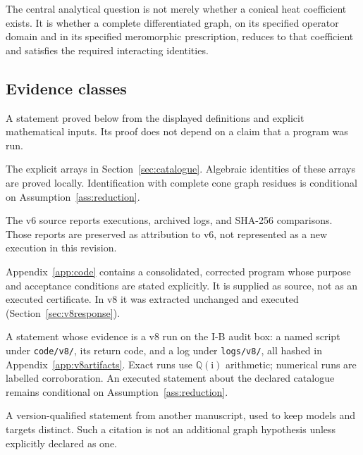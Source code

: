\documentclass[11pt,a4paper]{article}
\newcommand{\ii}{\mathrm i}
\newcommand{\loc}[1]{\nolinkurl{#1}}
\theoremstyle{plain}
\theoremstyle{definition}
\theoremstyle{remark}
\numberwithin{equation}{section}
\begin{document}
The central analytical question is not merely whether a conical
heat coefficient exists. It is whether a complete differentiated
graph, on its specified operator domain and in its specified
meromorphic prescription, reduces to that coefficient and
satisfies the required interacting identities.

\subsection{Evidence classes}

\begin{description}[style=nextline,leftmargin=0pt]
\item[Analytical proof.]
A statement proved below from the displayed definitions and
explicit mathematical inputs. Its proof does not depend on a
claim that a program was run.

\item[Declared catalogue.]
The explicit arrays in Section~\ref{sec:catalogue}. Algebraic
identities of these arrays are proved locally. Identification
with complete cone graph residues is conditional on
Assumption~\ref{ass:reduction}.

\item[Historical executed record.]
The v6 source reports executions, archived logs, and SHA-256
comparisons. Those reports are preserved as attribution to v6,
not represented as a new execution in this revision.

\item[Embedded verification program.]
Appendix~\ref{app:code} contains a consolidated, corrected program
whose purpose and acceptance conditions are stated explicitly.
It is supplied as source, not as an executed certificate.
In v8 it was extracted unchanged and executed
(Section~\ref{sec:v8response}).

\item[Executed in v8.]
A statement whose evidence is a v8 run on the I-B audit box:
a named script under \loc{code/v8/}, its return code, and a log
under \loc{logs/v8/}, all hashed in Appendix~\ref{app:v8artifacts}.
Exact runs use \(\mathbb Q(\ii)\) arithmetic; numerical runs are
labelled corroboration. An executed statement about the declared
catalogue remains conditional on Assumption~\ref{ass:reduction}.

\item[Documentary comparison.]
A version-qualified statement from another manuscript, used to
keep models and targets distinct. Such a citation is not an
additional graph hypothesis unless explicitly declared as one.
\end{description}
\end{document}
